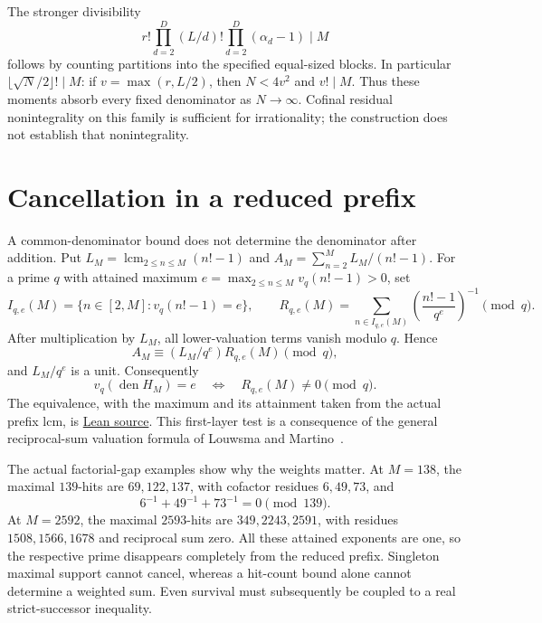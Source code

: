 \documentclass[11pt]{article}
\begin{document}
The stronger divisibility
\[
r!\prod_{d=2}^D(L/d)!\prod_{d=2}^D(\alpha_d-1)\mid M
\]
follows by counting partitions into the specified equal-sized blocks.
In particular $\lfloor\sqrt N/2\rfloor!\mid M$: if
$v=\max(r,L/2)$, then $N<4v^2$ and $v!\mid M$.
Thus these moments absorb every fixed denominator as $N\to\infty$.
Cofinal residual nonintegrality on this family is sufficient for irrationality;
the construction does not establish that nonintegrality.

\section{Cancellation in a reduced prefix}\label{sec:prime-pole}

A common-denominator bound does not determine the denominator after addition.
Put $L_M=\operatorname{lcm}_{2\le n\le M}(n!-1)$ and
$A_M=\sum_{n=2}^M L_M/(n!-1)$.  For a prime $q$ with attained maximum
$e=\max_{2\le n\le M}v_q(n!-1)>0$, set
\[
I_{q,e}(M)=\{n\in[2,M]:v_q(n!-1)=e\},\qquad
R_{q,e}(M)=\sum_{n\in I_{q,e}(M)}
\left(\frac{n!-1}{q^e}\right)^{-1}\pmod q.
\]
After multiplication by $L_M$, all lower-valuation terms vanish modulo $q$.
Hence
\[
A_M\equiv (L_M/q^e)R_{q,e}(M)\pmod q,
\]
and $L_M/q^e$ is a unit.  Consequently
\begin{equation}
v_q(\operatorname{den}H_M)=e
\quad\Longleftrightarrow\quad R_{q,e}(M)\ne0\pmod q.
\label{eq:prime-pole-survival}
\end{equation}
The equivalence, with the maximum and its attainment taken from the actual
prefix lcm, is \href{https://github.com/wcook04/plectis-erdos/blob/f36a98bf3d3e6f65f1074e3b800e3293d5b8a51a/ErdosProblems/Erdos68/PaperCompletePrimePole.lean#L118}{Lean source}.
This first-layer test is a consequence of the general reciprocal-sum
valuation formula of Louwsma and Martino~\cite[Lemma~4.1]{louwsma-martino}.

The actual factorial-gap examples show why the weights matter.  At
$M=138$, the maximal $139$-hits are $69,122,137$, with cofactor residues
$6,49,73$, and
\[
6^{-1}+49^{-1}+73^{-1}=0\pmod{139}.
\]
At $M=2592$, the maximal $2593$-hits are $349,2243,2591$, with residues
$1508,1566,1678$ and reciprocal sum zero.  All these attained exponents are
one, so the respective prime disappears completely from the reduced prefix.
Singleton maximal support cannot cancel, whereas a hit-count bound alone
cannot determine a weighted sum.  Even survival must subsequently be coupled
to a real strict-successor inequality.
\end{document}
